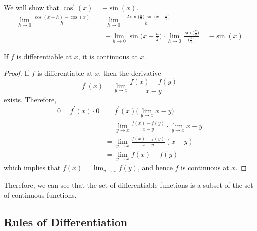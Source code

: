   \begin{example}
    We will show that $\cos^\prime (x) = - \sin(x)$. 
    \begin{align*}
        \lim_{h\rightarrow 0} \frac{\cos(x+h) - \cos(x)}{h} & = \lim_{h \rightarrow 0} \frac{-2 \sin \big(\frac{h}{2}\big) \, \sin \big( x + \frac{h}{2}\big)}{h} \\
        & = - \lim_{h\rightarrow 0} \sin \Big( x + \frac{h}{2} \Big) \cdot \lim_{h\rightarrow0} \frac{\sin\big(\frac{h}{2} \big)}{\big( \frac{h}{2} \big)} = -\sin(x)
    \end{align*}
  \end{example}


  \begin{lemma}
    If $f$ is differentiable at $x$, it is continuous at $x$. 
  \end{lemma}
  \begin{proof} 
    If $f$ is differentiable at $x$, then the derivative 
    \begin{equation}
      f^\prime (x) = \lim_{y \to x} \frac{f(x) - f(y)}{x - y} 
    \end{equation}
    exists. Therefore, 
    \begin{align}
      0 = f^\prime (x) \cdot 0 & = f^\prime (x) \big( \lim_{y \to x} x - y \big) \\
                               & = \lim_{y \to x} \frac{f(x) - f(y)}{x - y} \cdot \lim_{y \to x} x - y \\
                               & = \lim_{y \to x} \frac{f(x) - f(y)}{x - y} (x - y) \\
                               & = \lim_{y \to x} f(x) - f(y)
    \end{align}
    which implies that $f(x) = \lim_{y \to x} f(y)$, and hence $f$ is continuous at $x$. 
  \end{proof} 

  Therefore, we can see that the set of differentiable functions is a subset of the set of continuous functions.  

\subsection{Rules of Differentiation}

